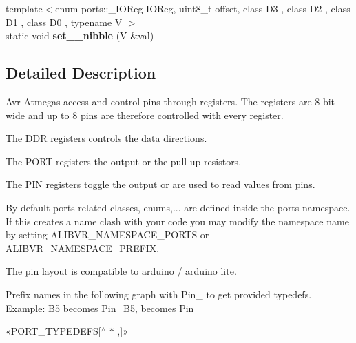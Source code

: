 \begin{DoxyCompactItemize}
\item 
{\footnotesize template$<$enum ports\+::\+\_\+\+I\+O\+Reg I\+O\+Reg, uint8\+\_\+t offset, class D3 , class D2 , class D1 , class D0 , typename V $>$ }\\static void {\bfseries set\+\_\+\_\+nibble} (V \&val)\hypertarget{namespaceports_af6f06d849f89492a6d3603f926c4595b}{}\label{namespaceports_af6f06d849f89492a6d3603f926c4595b}

\end{DoxyCompactItemize}


\subsection{Detailed Description}
Avr Atmegas access and control pins through registers. The registers are 8 bit wide and up to 8 pins are therefore controlled with every register. 


\begin{DoxyItemize}
\item The D\+DR registers controls the data directions.
\item The P\+O\+RT registers the output or the pull up resistors.
\item The P\+IN registers toggle the output or are used to read values from pins.
\end{DoxyItemize}

By default ports related classes, enums,... are defined inside the {\ttfamily ports} namespace. If this creates a name clash with your code you may modify the namespace name by setting A\+L\+I\+B\+V\+R\+\_\+\+N\+A\+M\+E\+S\+P\+A\+C\+E\+\_\+\+P\+O\+R\+TS or A\+L\+I\+B\+V\+R\+\_\+\+N\+A\+M\+E\+S\+P\+A\+C\+E\+\_\+\+P\+R\+E\+F\+IX.

The pin layout is compatible to arduino / arduino lite.

Prefix names in the following graph with {\ttfamily Pin\+\_\+} to get provided {\ttfamily typedef}s. Example\+: {\ttfamily B5} becomes {\ttfamily Pin\+\_\+\+B5}, {} becomes {\ttfamily Pin\+\_}

«\+P\+O\+R\+T\+\_\+\+T\+Y\+P\+E\+D\+E\+FS\mbox{[}$^\wedge$ $\ast$ ,\mbox{]}»


